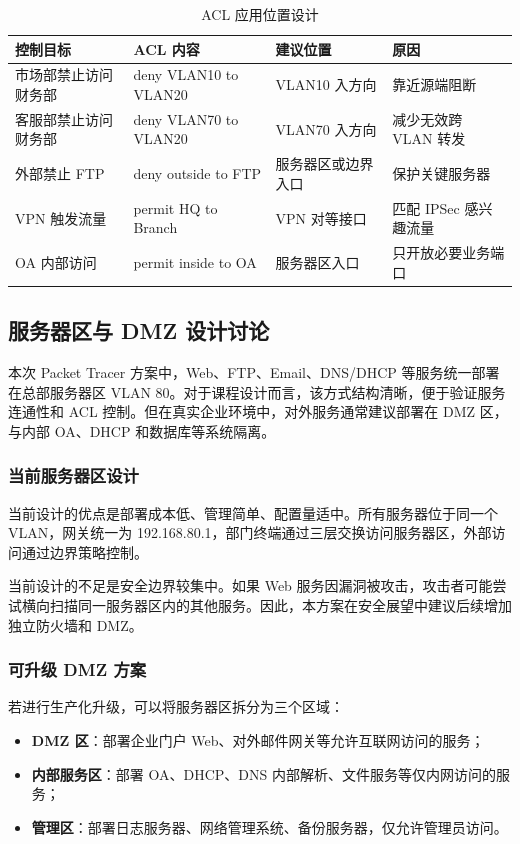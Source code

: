\documentclass[12pt,a4paper]{ctexart}
\begin{document}
\begin{table}[H]
\centering
\caption{ACL 应用位置设计}
\label{tab:acl-place}
\begin{tabular}{|p{3cm}|p{4cm}|p{3cm}|p{4cm}|}
\hline
\textbf{控制目标} & \textbf{ACL 内容} & \textbf{建议位置} & \textbf{原因} \\ \hline
市场部禁止访问财务部 & deny VLAN10 to VLAN20 & VLAN10 入方向 & 靠近源端阻断 \\ \hline
客服部禁止访问财务部 & deny VLAN70 to VLAN20 & VLAN70 入方向 & 减少无效跨 VLAN 转发 \\ \hline
外部禁止 FTP & deny outside to FTP & 服务器区或边界入口 & 保护关键服务器 \\ \hline
VPN 触发流量 & permit HQ to Branch & VPN 对等接口 & 匹配 IPSec 感兴趣流量 \\ \hline
OA 内部访问 & permit inside to OA & 服务器区入口 & 只开放必要业务端口 \\ \hline
\end{tabular}
\end{table}

\subsection{服务器区与 DMZ 设计讨论}

本次 Packet Tracer 方案中，Web、FTP、Email、DNS/DHCP 等服务统一部署在总部服务器区 VLAN 80。对于课程设计而言，该方式结构清晰，便于验证服务连通性和 ACL 控制。但在真实企业环境中，对外服务通常建议部署在 DMZ 区，与内部 OA、DHCP 和数据库等系统隔离。

\subsubsection{当前服务器区设计}

当前设计的优点是部署成本低、管理简单、配置量适中。所有服务器位于同一个 VLAN，网关统一为 192.168.80.1，部门终端通过三层交换访问服务器区，外部访问通过边界策略控制。

当前设计的不足是安全边界较集中。如果 Web 服务因漏洞被攻击，攻击者可能尝试横向扫描同一服务器区内的其他服务。因此，本方案在安全展望中建议后续增加独立防火墙和 DMZ。

\subsubsection{可升级 DMZ 方案}

若进行生产化升级，可以将服务器区拆分为三个区域：

\begin{itemize}
    \item \textbf{DMZ 区}：部署企业门户 Web、对外邮件网关等允许互联网访问的服务；
    \item \textbf{内部服务区}：部署 OA、DHCP、DNS 内部解析、文件服务等仅内网访问的服务；
    \item \textbf{管理区}：部署日志服务器、网络管理系统、备份服务器，仅允许管理员访问。
\end{itemize}
\end{document}
